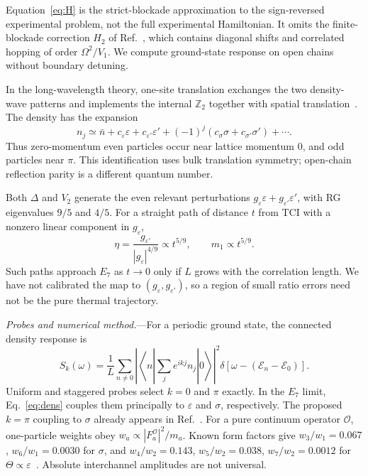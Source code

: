 \documentclass[aps,prl,twocolumn,superscriptaddress,showpacs,floatfix,10pt]{revtex4-2}
\begin{document}
Equation~\eqref{eq:H} is the strict-blockade approximation to the sign-reversed
experimental problem, not the full experimental Hamiltonian. It omits the
finite-blockade correction $H_2$ of Ref.~\cite{Sun2026}, which contains diagonal
shifts and correlated hopping of order $\Omega^2/V_1$. We compute ground-state response
on open chains without boundary detuning.

In the long-wavelength theory, one-site translation exchanges the two density-wave
patterns and implements the internal $\mathbb Z_2$ together with spatial
translation~\cite{Slagle2021}. The density has the expansion
\begin{equation}
 n_j\simeq\bar n+c_\varepsilon\varepsilon+c_{\varepsilon'}\varepsilon'
       +(-1)^j(c_\sigma\sigma+c_{\sigma'}\sigma')+\cdots .
 \label{eq:dens}
\end{equation}
Thus zero-momentum even particles occur near lattice momentum $0$, and odd
particles near $\pi$. This identification uses bulk translation symmetry; open-chain
reflection parity is a different quantum number.

Both $\Delta$ and $V_2$ generate the even relevant perturbations
$g_\varepsilon\varepsilon+g_{\varepsilon'}\varepsilon'$, with RG eigenvalues
$9/5$ and $4/5$. For a straight path of distance $t$ from TCI with a nonzero
linear component in $g_\varepsilon$,
\begin{equation}
 \eta=\frac{g_{\varepsilon'}}{|g_\varepsilon|^{4/9}}
       \propto t^{5/9},\qquad m_1\propto t^{5/9}.
 \label{eq:RG}
\end{equation}
Such paths approach $E_7$ as $t\to0$ only if $L$ grows with the correlation length.
We have not calibrated the map to $(g_\varepsilon,g_{\varepsilon'})$, so a region
of small ratio errors need not be the pure thermal trajectory.

\emph{Probes and numerical method.}---For a periodic ground state, the connected
density response is
\begin{equation}
 S_k(\omega)=\frac1L\sum_{n\ne0}
 \left|\left\langle n\left|\sum_j e^{ikj}n_j\right|0\right\rangle\right|^2
 \delta[\omega-(\mathcal E_n-\mathcal E_0)].
 \label{eq:spec}
\end{equation}
Uniform and staggered probes select $k=0$ and $\pi$ exactly. In the $E_7$ limit,
Eq.~\eqref{eq:dens} couples them principally to $\varepsilon$ and $\sigma$,
respectively. The proposed $k=\pi$ coupling to $\sigma$ already appears in
Ref.~\cite{Sun2026}. For a pure continuum operator $\mathcal O$, one-particle
weights obey $w_a\propto|F_a^{\mathcal O}|^2/m_a$. Known form factors give
$w_3/w_1=0.067$, $w_6/w_1=0.0030$ for $\sigma$, and
$w_4/w_2=0.143$, $w_5/w_2=0.038$, $w_7/w_2=0.0012$ for
$\Theta\propto\varepsilon$~\cite{Acerbi1996,CortesCubero2022}.
Absolute interchannel amplitudes are not universal.
\end{document}
